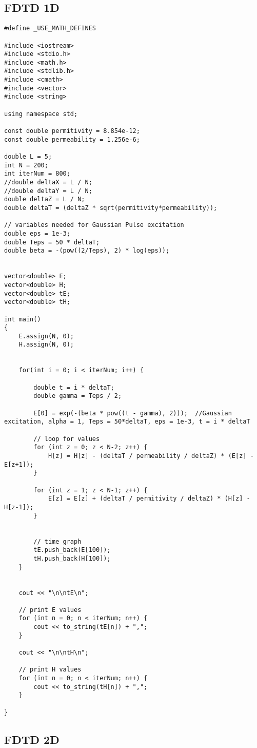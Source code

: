 \subsection{FDTD 1D}
\begin{verbatim}
#define _USE_MATH_DEFINES

#include <iostream>
#include <stdio.h>
#include <math.h>
#include <stdlib.h>
#include <cmath>
#include <vector>
#include <string>

using namespace std;

const double permitivity = 8.854e-12;
const double permeability = 1.256e-6;

double L = 5;
int N = 200;
int iterNum = 800;
//double deltaX = L / N;
//double deltaY = L / N;
double deltaZ = L / N;
double deltaT = (deltaZ * sqrt(permitivity*permeability));

// variables needed for Gaussian Pulse excitation
double eps = 1e-3;
double Teps = 50 * deltaT;
double beta = -(pow((2/Teps), 2) * log(eps));


vector<double> E;
vector<double> H;
vector<double> tE;
vector<double> tH;

int main()
{
	E.assign(N, 0);
	H.assign(N, 0);
	
	
	for(int i = 0; i < iterNum; i++) {
		
		double t = i * deltaT;
		double gamma = Teps / 2;
		
		E[0] = exp(-(beta * pow((t - gamma), 2)));  //Gaussian excitation, alpha = 1, Teps = 50*deltaT, eps = 1e-3, t = i * deltaT
		
		// loop for values
		for (int z = 0; z < N-2; z++) {
			H[z] = H[z] - (deltaT / permeability / deltaZ) * (E[z] - E[z+1]);
		}
		
		for (int z = 1; z < N-1; z++) {
			E[z] = E[z] + (deltaT / permitivity / deltaZ) * (H[z] - H[z-1]);
		}
		
		
		// time graph
		tE.push_back(E[100]);
		tH.push_back(H[100]);
	}
	
	
	cout << "\n\ntE\n";
	
	// print E values
	for (int n = 0; n < iterNum; n++) {
		cout << to_string(tE[n]) + ",";
	}
	
	cout << "\n\ntH\n";
	
	// print H values
	for (int n = 0; n < iterNum; n++) {
		cout << to_string(tH[n]) + ",";
	}
	
}
\end{verbatim}

\subsection{FDTD 2D}

